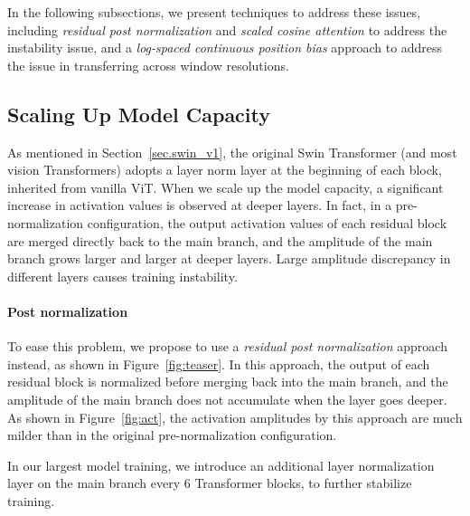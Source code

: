 \documentclass[10pt,twocolumn,letterpaper]{article}
\begin{document}
In the following subsections, we present techniques to address these issues, including \emph{residual post normalization} and \emph{scaled cosine attention} to address the instability issue, and a \emph{log-spaced continuous position bias} approach to address the issue in transferring across window resolutions.

\subsection{Scaling Up Model Capacity}

As mentioned in Section~\ref{sec.swin_v1}, the original Swin Transformer (and most vision Transformers) adopts a layer norm layer at the beginning of each block, inherited from vanilla ViT. When we scale up the model capacity, a significant increase in activation values is observed at deeper layers. In fact, in a pre-normalization configuration, the output activation values of each residual block are merged directly back to the main branch, and the amplitude of the main branch grows larger and larger at deeper layers. Large amplitude discrepancy in different layers causes training instability.

\paragraph{Post normalization}
To ease this problem, we propose to use a \emph{residual post normalization} approach instead, as shown in Figure~\ref{fig:teaser}. In this approach, the output of each residual block is normalized before merging back into the main branch, and the amplitude of the main branch does not accumulate when the layer goes deeper. As shown in Figure~\ref{fig:act}, the activation amplitudes by this approach are much milder than in the original pre-normalization configuration. 

In our largest model training, we introduce an additional layer normalization layer on the main branch every 6 Transformer blocks, to further stabilize training.
\end{document}
